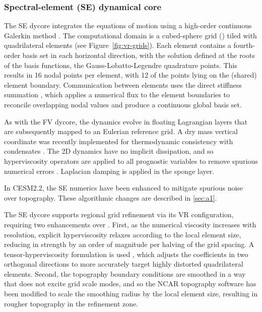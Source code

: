 \documentclass[draft]{agujournal2019}
\begin{document}
\subsubsection{Spectral-element (SE) dynamical core}

The SE dycore integrates the {\color{blue}{hydrostatic}} equations of motion using a high-order continuous Galerkin method \cite{TTI1997JCP,TF2010JCP}. The computational domain is a cubed-sphere grid ({\color{blue}{A cubed-sphere grid is obtained by projecting each face of a cube onto a sphere}}) tiled with quadrilateral elements (see Figure~\ref{fig:vr-grids}). Each element contains a fourth-order basis set in each horizontal direction, with the solution defined at the roots of the basis functions, the Gauss-Lobatto-Legendre quadrature points. This results in 16 nodal points per element, with 12 of the points lying on the (shared) element boundary. Communication between elements uses the direct stiffness summation \cite{canuto2007}, which applies a numerical flux to the element boundaries to reconcile overlapping nodal values and produce a continuous global basis set. 

As with the FV dycore, the dynamics evolve in floating Lagrangian layers that are subsequently mapped to an Eulerian reference grid. A dry mass vertical coordinate was recently implemented for thermodynamic consistency with condensates \cite{LetAl2018JAMES}. The 2D dynamics have no implicit dissipation, and so hyperviscosity operators are applied to all prognostic variables to remove spurious numerical errors \cite{DetAl2012IJHPCA}. Laplacian damping is applied in the sponge layer.

{\color{blue}{SE is a next generation of dycore, and is less mature than the FV dycore due to its shorter history.}} In CESM2.2, the SE numerics have been enhanced {\color{blue}{relative to CESM2.0}} to mitigate spurious noise over topography. These algorithmic changes are described in \ref{sec:a1}. {\color{blue}{Future versions of CESM will likely continue to include further optimizations and enhancements to the (nascent) SE dycore.}} 

The SE dycore supports regional grid refinement via its VR configuration, requiring two enhancements over {\color{blue}{quasi-uniform resolution grids}}. First, as the numerical viscosity increases with resolution, explicit hyperviscosity relaxes according to the local element size, reducing in strength  by an order of magnitude per halving of the grid spacing. A tensor-hyperviscosity formulation is used \cite{GetAl2014GMD}, which adjusts the coefficients in two orthogonal directions to more accurately target highly distorted quadrilateral elements. Second, the topography boundary conditions are smoothed in a way that does not excite grid scale modes, and so the NCAR topography software \cite{LetAl2015GMD} has been modified to scale the smoothing radius by the local element size, resulting in rougher topography in the refinement zone. 
\end{document}

